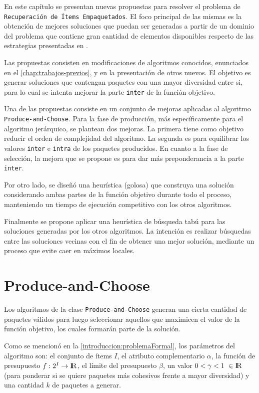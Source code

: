En este capítulo se presentan nuevas propuestas para resolver el problema de \texttt{\\Recuperación de Ítems Empaquetados}. El foco principal de las mismas es la obtención de mejores soluciones que puedan ser generadas a partir de un dominio del problema que contiene gran cantidad de elementos disponibles respecto de las estrategias presentadas en \cite{journals/tkde/Amer-YahiaBCFMZ14}.

Las propuestas consisten en modificaciones de algoritmos conocidos, enunciados en el \autoref{chap:trabajos-previos}, y en la presentación de otros nuevos. El objetivo es generar soluciones que contengan paquetes con una mayor diversidad entre si, para lo cual se intenta mejorar la parte \texttt{inter} de la función objetivo.

Una de las propuestas consiste en un conjunto de mejoras aplicadas al algoritmo \allowbreak \texttt{Produce\allowbreak-and\allowbreak-Choose}. Para la fase de producción, más específicamente para el algoritmo jerárquico, se plantean dos mejoras. La primera tiene como objetivo reducir el orden de complejidad del algoritmo. La segunda es para equilibrar los valores \texttt{inter} e \texttt{intra} de los paquetes producidos. En cuanto a la fase de selección, la mejora que se propone es para dar más preponderancia a la parte \texttt{inter}.

Por otro lado, se diseñó una heurística (golosa) que construya una solución considerando ambas partes de la función objetivo durante todo el proceso, manteniendo un tiempo de ejecución competitivo con los otros algoritmos.

Finalmente se propone aplicar una heurística de búsqueda tabú para las soluciones generadas por los otros algoritmos. La intención es realizar búsquedas entre las soluciones vecinas con el fin de obtener una mejor solución, mediante un proceso que evite caer en máximos locales.

\section{Produce-and-Choose}
Los algoritmos de la clase \texttt{Produce\allowbreak-and\allowbreak-Choose} generan una cierta cantidad de paquetes válidos para luego seleccionar aquellos que maximicen el valor de la función objetivo, los cuales formarán parte de la solución.

Como se mencionó en la \autoref{introduccion:problemaFormal}, los parámetros del algoritmo son: el conjunto de ítems $I$, el atributo complementario $\alpha$, la función de presupuesto $f: 2^{I} \rightarrow \rm I \!R$, el límite del presupuesto $\beta$, un valor $0 < \gamma < 1\ \in \rm I \!R$ (para ponderar si se quiere paquetes más cohesivos frente a mayor diversidad) y una cantidad $k$ de paquetes a generar. 

